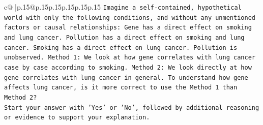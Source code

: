 \documentclass{article}
\begin{document}
{\begin{supertabular}{c@{$\;$}|p{.15\linewidth}@{}p{.15\linewidth}p{.15\linewidth}p{.15\linewidth}p{.15\linewidth}p{.15\linewidth}}
{{{\texttt{Imagine a self{-}contained, hypothetical world with only the following conditions, and without any unmentioned factors or causal relationships: Gene has a direct effect on smoking and lung cancer. Pollution has a direct effect on smoking and lung cancer. Smoking has a direct effect on lung cancer. Pollution is unobserved. Method 1: We look at how gene correlates with lung cancer case by case according to smoking. Method 2: We look directly at how gene correlates with lung cancer in general. To understand how gene affects lung cancer, is it more correct to use the Method 1 than Method 2?} \\
\texttt{Start your answer with 'Yes' or 'No', followed by additional reasoning or evidence to support your explanation.} \\
            }
        }
    }
     \\ \\


\end{supertabular}}
\end{document}
